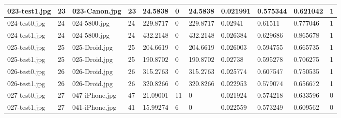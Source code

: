 \begin{landscape}
\begin{longtable}{|p{2cm}|p{1cm}|p{2cm}|p{1cm}|p{2cm}|p{1cm}|p{2cm}|p{2cm}|p{2cm}|p{2cm}|p{1cm}|}
		023-test1.jpg   & 23               & 023-Canon.jpg         & 23                          & 24.5838               & 0                       & 24.5838                    & 0.021991              & 0.575344              & 0.621042                 & 1                \\ \hline
		024-test0.jpg   & 24               & 024-5800.jpg          & 24                          & 229.8717              & 0                       & 229.8717                   & 0.02941               & 0.61511               & 0.777046                 & 1                \\ \hline
		024-test1.jpg   & 24               & 024-5800.jpg          & 24                          & 432.2148              & 0                       & 432.2148                   & 0.026384              & 0.629686              & 0.865678                 & 1                \\ \hline
		025-test0.jpg   & 25               & 025-Droid.jpg         & 25                          & 204.6619              & 0                       & 204.6619                   & 0.026003              & 0.594755              & 0.665735                 & 1                \\ \hline
		025-test1.jpg   & 25               & 025-Droid.jpg         & 25                          & 190.8702              & 0                       & 190.8702                   & 0.02738               & 0.595278              & 0.706275                 & 1                \\ \hline
		026-test0.jpg   & 26               & 026-Droid.jpg         & 26                          & 315.2763              & 0                       & 315.2763                   & 0.025774              & 0.607547              & 0.750535                 & 1                \\ \hline
		026-test1.jpg   & 26               & 026-Droid.jpg         & 26                          & 320.8266              & 0                       & 320.8266                   & 0.022953              & 0.579074              & 0.656672                 & 1                \\ \hline
		027-test0.jpg   & 27               & 047-iPhone.jpg        & 47                          & 21.09001              & 11                      & 0                          & 0.021924              & 0.574218              & 0.633596                 & 0                \\ \hline
		027-test1.jpg   & 27               & 041-iPhone.jpg        & 41                          & 15.99274              & 6                       & 0                          & 0.022559              & 0.573249              & 0.609562                 & 0                \\ \hline

\end{longtable}
\end{landscape}
